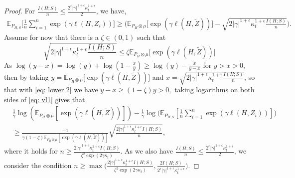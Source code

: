 \documentclass{article}
\theoremstyle{plain}
\theoremstyle{plain}
\theoremstyle{definition}
\theoremstyle{remark}
\newcommand{\mbE}{\mathbb{E}}
\begin{document}
\begin{proof}
  For $\frac{I(H;S)}{n}\leq \frac{2^{\epsilon}|\gamma|^{1+\epsilon} \kappa_t^{1+\epsilon}}{2}$, we have,
    \begin{equation}\label{eq: vl1}
    \begin{split}
        \mbE_{P_{H,S}}\Big[\frac{1}{n}\sum_{i=1}^n \exp(\gamma \ell(H,Z_i))\Big]\geq \Big(\mbE_{P_{H}\otimes \mu}\Big[ \exp(\gamma \ell(H,\tilde Z))\Big]-  \sqrt{2|\gamma|^{1+\epsilon} \kappa_t^{1+\epsilon}\frac{I(H;S)}{n}}\Big).
    \end{split}
    \end{equation}
    Assume for now that there is a $\zeta\in(0,1)$ such that
    \begin{equation}
         \sqrt{2|\gamma|^{1+\epsilon} \kappa_t^{1+\epsilon}\frac{I(H;S)}{n}}\leq \zeta\mbE_{P_{H}\otimes \mu}\Big[ \exp(\gamma \ell(H,\tilde Z))\Big]
    \end{equation}
    As $\log(y-x)=\log(y)+\log(1-\frac{x}{y})\geq \log(y)-\frac{x}{y-x}$ for $y>x>0$, then by taking $y= \mbE_{P_{H}\otimes \mu}\Big[ \exp(\gamma \ell(H,\tilde Z))\Big]$ and $x= \sqrt{2|\gamma|^{1+\epsilon} \kappa_t^{1+\epsilon}\frac{I(H;S)}{n}}$, so that with \eqref{eq: lower 2} we have $ y - x \ge (1- \zeta) y>0,$ taking logarithms on both sides of \eqref{eq: vl1} gives that 
     \begin{equation}\label{eq: vl12}
    \begin{split}
        &\frac{1}{\gamma}\log(\mbE_{P_{H}\otimes \mu}[ \exp(\gamma \ell(H,\tilde Z))])-\frac{1}{\gamma}\log\Big(\mbE_{P_{H,S}}[\frac{1}{n}\sum_{i=1}^n \exp(\gamma \ell(H,Z_i))]\Big)\\
        &\geq  \frac{-1}{\gamma(1-\zeta) \mbE_{P_{H}\otimes \mu}[ \exp(\gamma \ell(H,\tilde Z))]} \sqrt{\frac{2|\gamma|^{1+\epsilon} \kappa_t^{1+\epsilon} I(H;S)}{n}},
    \end{split}
    \end{equation}
    where it holds for $n\geq \frac{2|\gamma|^{1+\epsilon} \kappa_t^{1+\epsilon} I(H;S)}{ \zeta^2\exp(2\gamma \kappa_t)}$. As we also have $\frac{I(H;S)}{n}\leq \frac{2^{\epsilon}|\gamma|^{1+\epsilon} \kappa_t^{1+\epsilon}}{2}$, we consider the condition $n\geq \max\big(\frac{2|\gamma|^{1+\epsilon} \kappa_t^{1+\epsilon} I(H;S)}{ \zeta^2\exp(2\gamma \kappa_t)},\frac{2I(H;S)}{2^{\epsilon}|\gamma|^{1+\epsilon} \kappa_t^{1+\epsilon}}\big)$.
    

\end{proof}
\end{document}

